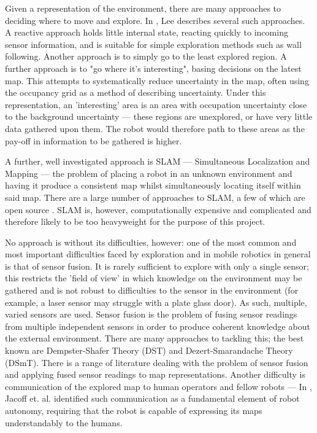 \documentclass[authoryearcitations]{UoYCSproject}
\begin{document}
Given a representation of the environment, there are many approaches to deciding where to move and explore. In \cite[chapter 4, p.~37]{lee}, Lee describes several such approaches. A reactive approach holds little internal state, reacting quickly to incoming sensor information, and is suitable for simple exploration methods such as wall following. Another approach is to simply go to the least explored region. A further approach is to "go where it's interesting", basing decisions on the latest map. This attempts to systematically reduce uncertainty in the map, often using the occupancy grid as a method of describing uncertainty. Under this representation, an 'interesting' area is an area with occupation uncertainty close to the background uncertainty --- these regions are unexplored, or have very little data gathered upon them. The robot would therefore path to these areas as the pay-off in information to be gathered is higher.

A further, well investigated approach is SLAM --- Simultaneous Localization and Mapping --- the problem of placing a robot in an unknown environment and having it produce a consistent map whilst simultaneously locating itself within said map\cite[p.~99]{slam}. There are a large number of approaches to SLAM, a few of which are open source \cite[p.~107]{slam}. SLAM is, however, computationally expensive and complicated and therefore likely to be too heavyweight for the purpose of this project.

No approach is without its difficulties, however: one of the most common and most important difficulties faced by exploration and in mobile robotics in general is that of sensor fusion. It is rarely sufficient to explore with only a single sensor; this restricts the 'field of view' in which knowledge on the environment may be gathered and is not robust to difficulties to the sensor in  the environment (for example, a laser sensor may struggle with a plate glass door). As such, multiple, varied sensors are used. Sensor fusion is the problem of fusing sensor readings from multiple independent sensors in order to produce coherent knowledge about the external environment. There are many approaches to tackling this; the best known are Dempster-Shafer Theory (DST) and Dezert-Smarandache Theory (DSmT). There is a range of literature dealing with the problem of sensor fusion and applying fused sensor readings to map representations. Another difficulty is communication of the explored map to human operators and fellow robots --- In \cite{jacoff}, Jacoff et. al. identified such communication as a fundamental element of robot autonomy, requiring that the robot is capable of expressing its maps understandably to the humans.
\end{document}

